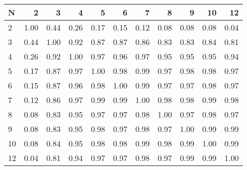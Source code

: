 \begin{tabular}{lrrrrrrrrrr}
\toprule
N &    2  &    3  &    4  &    5  &    6  &    7  &    8  &    9  &    10 &    12 \\
\midrule
2  &  1.00 &  0.44 &  0.26 &  0.17 &  0.15 &  0.12 &  0.08 &  0.08 &  0.08 &  0.04 \\
3  &  0.44 &  1.00 &  0.92 &  0.87 &  0.87 &  0.86 &  0.83 &  0.83 &  0.84 &  0.81 \\
4  &  0.26 &  0.92 &  1.00 &  0.97 &  0.96 &  0.97 &  0.95 &  0.95 &  0.95 &  0.94 \\
5  &  0.17 &  0.87 &  0.97 &  1.00 &  0.98 &  0.99 &  0.97 &  0.98 &  0.98 &  0.97 \\
6  &  0.15 &  0.87 &  0.96 &  0.98 &  1.00 &  0.99 &  0.97 &  0.97 &  0.98 &  0.97 \\
7  &  0.12 &  0.86 &  0.97 &  0.99 &  0.99 &  1.00 &  0.98 &  0.98 &  0.99 &  0.98 \\
8  &  0.08 &  0.83 &  0.95 &  0.97 &  0.97 &  0.98 &  1.00 &  0.97 &  0.98 &  0.97 \\
9  &  0.08 &  0.83 &  0.95 &  0.98 &  0.97 &  0.98 &  0.97 &  1.00 &  0.99 &  0.99 \\
10 &  0.08 &  0.84 &  0.95 &  0.98 &  0.98 &  0.99 &  0.98 &  0.99 &  1.00 &  0.99 \\
12 &  0.04 &  0.81 &  0.94 &  0.97 &  0.97 &  0.98 &  0.97 &  0.99 &  0.99 &  1.00 \\
\bottomrule
\end{tabular}
